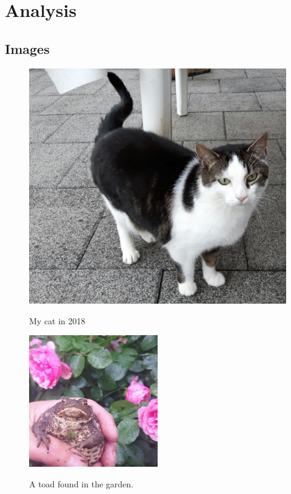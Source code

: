 \chapter{Analysis}\label{chapterAnalysis}






\section{Images}

\begin{figure}[p]
\centering
\includegraphics{img/Dala}
\label{img:cat}
\caption{My cat in 2018}
\end{figure}

\blindmathtrue\Blindtext\Blindtext




\begin{figure}[p]
\centering
\includegraphics[width=0.5\textwidth]{img/toad}
\label{img:toad}
\caption{A toad found in the garden.}
\end{figure}
